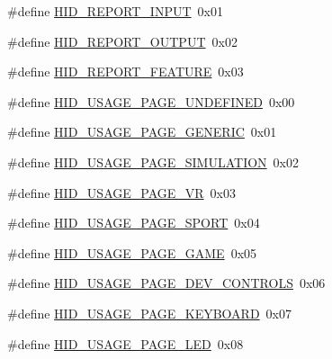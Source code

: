 \begin{DoxyCompactItemize}
\item 
\#define \hyperlink{group___u_s_b_d___h_i_d_gae73239f50524749753c8b6e1f11253b9}{H\+I\+D\+\_\+\+R\+E\+P\+O\+R\+T\+\_\+\+I\+N\+P\+UT}~0x01
\item 
\#define \hyperlink{group___u_s_b_d___h_i_d_ga63548c31cddad143e8eb163be04357cd}{H\+I\+D\+\_\+\+R\+E\+P\+O\+R\+T\+\_\+\+O\+U\+T\+P\+UT}~0x02
\item 
\#define \hyperlink{group___u_s_b_d___h_i_d_ga0914abbc0a279f78b37d567c54f4888e}{H\+I\+D\+\_\+\+R\+E\+P\+O\+R\+T\+\_\+\+F\+E\+A\+T\+U\+RE}~0x03
\end{DoxyCompactItemize}
\begin{DoxyCompactItemize}
\item 
\#define \hyperlink{group___u_s_b_d___h_i_d_ga73a32173a51a8d1e21dd14de726593d7}{H\+I\+D\+\_\+\+U\+S\+A\+G\+E\+\_\+\+P\+A\+G\+E\+\_\+\+U\+N\+D\+E\+F\+I\+N\+ED}~0x00
\item 
\#define \hyperlink{group___u_s_b_d___h_i_d_ga9c343007cfc4f4836b8a8aec4fded7ee}{H\+I\+D\+\_\+\+U\+S\+A\+G\+E\+\_\+\+P\+A\+G\+E\+\_\+\+G\+E\+N\+E\+R\+IC}~0x01
\item 
\#define \hyperlink{group___u_s_b_d___h_i_d_ga2cdc484710c424ebeb438f72f2a2e942}{H\+I\+D\+\_\+\+U\+S\+A\+G\+E\+\_\+\+P\+A\+G\+E\+\_\+\+S\+I\+M\+U\+L\+A\+T\+I\+ON}~0x02
\item 
\#define \hyperlink{group___u_s_b_d___h_i_d_ga746db0254ad632c95b768ee09d8c148d}{H\+I\+D\+\_\+\+U\+S\+A\+G\+E\+\_\+\+P\+A\+G\+E\+\_\+\+VR}~0x03
\item 
\#define \hyperlink{group___u_s_b_d___h_i_d_ga09fcd4f26f12737654445e388ea5c9ff}{H\+I\+D\+\_\+\+U\+S\+A\+G\+E\+\_\+\+P\+A\+G\+E\+\_\+\+S\+P\+O\+RT}~0x04
\item 
\#define \hyperlink{group___u_s_b_d___h_i_d_ga953e215830449d6bc0718279a9ec914c}{H\+I\+D\+\_\+\+U\+S\+A\+G\+E\+\_\+\+P\+A\+G\+E\+\_\+\+G\+A\+ME}~0x05
\item 
\#define \hyperlink{group___u_s_b_d___h_i_d_ga41932b4f7dcc0cacd501c6b399bd8332}{H\+I\+D\+\_\+\+U\+S\+A\+G\+E\+\_\+\+P\+A\+G\+E\+\_\+\+D\+E\+V\+\_\+\+C\+O\+N\+T\+R\+O\+LS}~0x06
\item 
\#define \hyperlink{group___u_s_b_d___h_i_d_ga9c5606a57164a07d982b30bdfc31a90a}{H\+I\+D\+\_\+\+U\+S\+A\+G\+E\+\_\+\+P\+A\+G\+E\+\_\+\+K\+E\+Y\+B\+O\+A\+RD}~0x07
\item 
\#define \hyperlink{group___u_s_b_d___h_i_d_ga4680a92b7f18a236eacc6f07c51befad}{H\+I\+D\+\_\+\+U\+S\+A\+G\+E\+\_\+\+P\+A\+G\+E\+\_\+\+L\+ED}~0x08
\item 

\end{DoxyCompactItemize}
